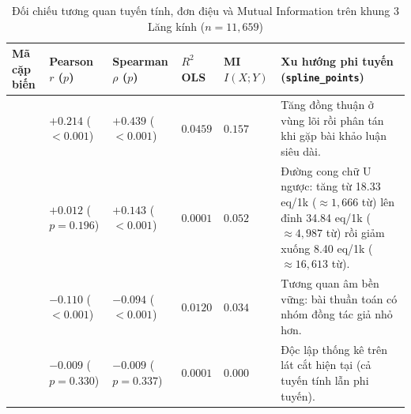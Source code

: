 \begin{table}[!htbp]
\centering
\small
\setlength{\tabcolsep}{3.5pt}
\caption[Đối chiếu 4 cặp biến qua khung chẩn đoán 3 Lăng kính]{Đối chiếu tương quan tuyến tính, đơn điệu và Mutual Information trên khung 3 Lăng kính (\texorpdfstring{$n = 11,659$}{n = 11,659})}
\label{tab:three_lens}
\begin{tabularx}{\linewidth}{|>{\raggedright\arraybackslash}p{31mm}|>{\centering\arraybackslash}p{19mm}|>{\centering\arraybackslash}p{21mm}|>{\centering\arraybackslash}p{14mm}|>{\centering\arraybackslash}p{15mm}|L|}
\hline
\textbf{Mã cặp biến} & \textbf{Pearson $r$ ($p$)} & \textbf{Spearman $\rho$ ($p$)} & \textbf{$R^2$ OLS} & \textbf{MI $I(X;Y)$} & \textbf{Xu hướng phi tuyến (\texttt{spline\_points})} \\ \hline
{} & $+0.214$ ($<0.001$) & $+0.439$ ($<0.001$) & $0.0459$ & $0.157$ & Tăng đồng thuận ở vùng lõi rồi phân tán khi gặp bài khảo luận siêu dài. \\ \hline
{} & $+0.012$ ($p=0.196$) & $+0.143$ ($<0.001$) & $0.0001$ & $0.052$ & Đường cong chữ U ngược: tăng từ 18.33 eq/1k ($\approx 1,666$ từ) lên đỉnh 34.84 eq/1k ($\approx 4,987$ từ) rồi giảm xuống 8.40 eq/1k ($\approx 16,613$ từ). \\ \hline
{} & $-0.110$ ($<0.001$) & $-0.094$ ($<0.001$) & $0.0120$ & $0.034$ & Tương quan âm bền vững: bài thuần toán có nhóm đồng tác giả nhỏ hơn. \\ \hline
{} & $-0.009$ ($p=0.330$) & $-0.009$ ($p=0.337$) & $0.0001$ & $0.000$ & Độc lập thống kê trên lát cắt hiện tại (cả tuyến tính lẫn phi tuyến). \\ \hline
\end{tabularx}
\end{table}
